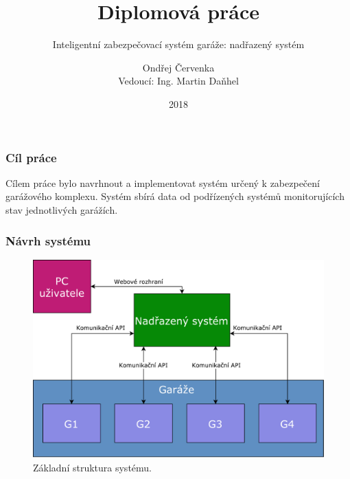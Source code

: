\documentclass{beamer}
\title
{Diplomová práce}
\subtitle{Inteligentní zabezpečovací systém garáže: nadřazený systém }
\author
{Ondřej Červenka \\ Vedoucí: Ing. Martin Daňhel}
\institute
{
  České vysoké učení technické v Praze\\
  Fakulta informačních technologií
}
\date{2018}
\begin{document}
  \frame{\titlepage}
  \begin{frame}
    \frametitle{Cíl práce}

    Cílem práce bylo navrhnout a implementovat systém určený k zabezpečení garážového komplexu. Systém sbírá data od podřízených systémů monitorujících stav jednotlivých garážích.



  \end{frame}

  \begin{frame}
    \frametitle{Návrh systému}

    \begin{figure}
        \includegraphics[scale=0.3]{../images/basic_struct.pdf}
        \caption{Základní struktura systému.}
      \end{figure}

  \end{frame}
\end{document}
